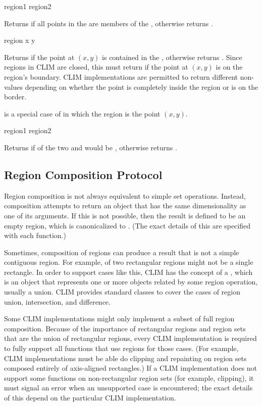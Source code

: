  {region1 region2}

Returns  if all points in the   are members
of the  , otherwise returns .

 {region x y}

Returns  if the point at $(x,y)$ is contained in the 
, otherwise returns .  Since regions in CLIM are closed,
this must return  if the point at $(x,y)$ is on the region's
boundary.  CLIM implementations are permitted to return different non-
values depending on whether the point is completely inside the region or is on
the border.

 is a special case of 
in which the region is the point $(x,y)$.

 {region1 region2}

Returns  if  of the two 
 and  would be , otherwise returns
.


\subsection {Region Composition Protocol}

Region composition is not always equivalent to simple set operations.  Instead,
composition attempts to return an object that has the same dimensionality as one
of its arguments.  If this is not possible, then the result is defined to be an
empty region, which is canonicalized to .  (The exact details of
this are specified with each function.)

Sometimes, composition of regions can produce a result that is not a simple
contiguous region.  For example,  of two rectangular regions
might not be a single rectangle.  In order to support cases like this, CLIM has
the concept of a , which is an object that represents one or
more  objects related by some region operation, usually a union.
CLIM provides standard classes to cover the cases of region union, intersection,
and difference.

Some CLIM implementations might only implement a subset of full region
composition.  Because of the importance of rectangular regions and region sets
that are the union of rectangular regions, every CLIM implementation is required
to fully support all functions that use regions for those cases.  (For example,
CLIM implementations must be able do clipping and repainting on region sets
composed entirely of axis-aligned rectangles.)  If a CLIM implementation does
not support some functions on non-rectangular region sets (for example,
clipping), it must signal an error when an unsupported case is encountered;
the exact details of this depend on the particular CLIM implementation.

